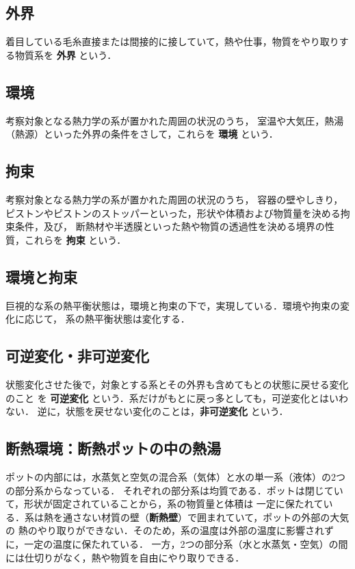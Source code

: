     \subsection{外界}
        着目している毛糸直接または間接的に接していて，熱や仕事，物質をやり取りする物質系を \textbf{外界} という．

    \subsection{環境}
     考察対象となる熱力学の系が置かれた周囲の状況のうち，
     室温や大気圧，熱湯（熱源）といった外界の条件をさして，これらを \textbf{環境} という．

    \subsection{拘束}
        考察対象となる熱力学の系が置かれた周囲の状況のうち，
        容器の壁やしきり，ピストンやピストンのストッパーといった，形状や体積および物質量を決める拘束条件，及び，
        断熱材や半透膜といった熱や物質の透過性を決める境界の性質，これらを \textbf{拘束} という．

    \subsection{環境と拘束}
        巨視的な系の熱平衡状態は，環境と拘束の下で，実現している．環境や拘束の変化に応じて，
        系の熱平衡状態は変化する．

    \subsection{可逆変化・非可逆変化}
        状態変化させた後で，対象とする系とその外界も含めてもとの状態に戻せる変化のこと
        を \textbf{可逆変化} という．系だけがもとに戻っ多としても，可逆変化とはいわない．
        逆に，状態を戻せない変化のことは，\textbf{非可逆変化} という．

    \subsection{断熱環境：断熱ポットの中の熱湯}
        ポットの内部には，水蒸気と空気の混合系（気体）と水の単一系（液体）の2つの部分系からなっている．
        それぞれの部分系は均質である．ポットは閉じていて，形状が固定されていることから，系の物質量と体積は
        一定に保たれている．系は熱を通さない材質の壁（\textbf{断熱壁}）で囲まれていて，ポットの外部の大気の
        熱のやり取りができない．そのため，系の温度は外部の温度に影響されずに，一定の温度に保たれている．
        一方，2つの部分系（水と水蒸気・空気）の間には仕切りがなく，熱や物質を自由にやり取りできる．

